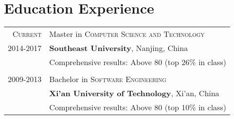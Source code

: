 \documentclass[a4paper,10pt]{article}
\begin{document}

\hfill
\begin{minipage}[t]{2.95in}
 \flushright
 {\footnotesize  \href{\mydepartmentemail}{\mydepartment} \\
                 \mydirection \\
                 \myaddrone \\ }
\end{minipage}
%
\begin{minipage}[t]{1.8in}
  \flushright
  {\footnotesize  \href{\myweb}{\myweb} \, \faGlobe \\
                  \href{mailto:\myemail}{\myemail} \, \faEnvelope \\
                  \small \textbf{\myphone} \, \faPhone}
\end{minipage}

\medskip


\noindent{\fontsize{40}{50}\selectfont \textsc{\myauthor}}


\section{Education Experience}

\begin{tabular}{r|p{15cm}}	
%
\textsc{Current} 	& Master in \textsc{Computer Science and Technology} \\
2014-2017 			& \textbf{Southeast University}, Nanjing, China \\
                    & Comprehensive results: Above 80 (top 26\% in class)\\
%
\multicolumn{2}{c}{} \\
2009-2013 			& Bachelor in \textsc{Software Engineering} \\
					& \textbf{Xi'an University of Technology}, Xi'an, China\\
					& Comprehensive results: Above 80 (top 10\% in class)\\
%
\end{tabular}

\end{document}
